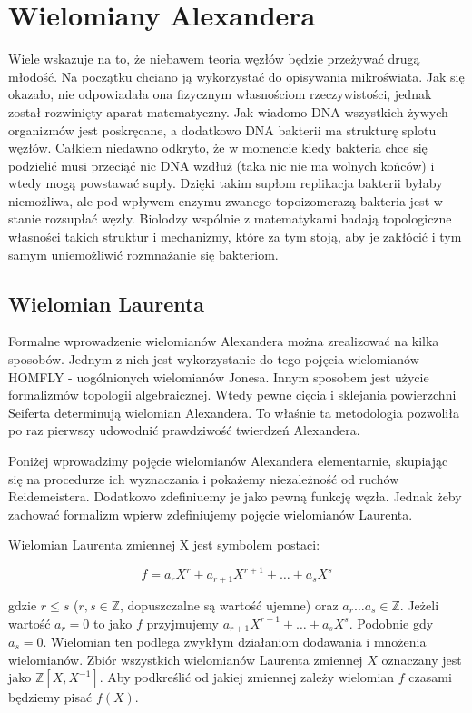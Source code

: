 \section{Wielomiany Alexandera}

Wiele wskazuje na to, że niebawem teoria węzłów będzie przeżywać drugą młodość. Na początku chciano ją wykorzystać do opisywania mikroświata. Jak się okazało, nie odpowiadała ona
fizycznym własnościom rzeczywistości, jednak został rozwinięty aparat matematyczny. Jak wiadomo DNA wszystkich żywych organizmów jest poskręcane, a dodatkowo DNA bakterii ma strukturę splotu węzłów.
Całkiem niedawno odkryto, że w momencie kiedy bakteria chce się podzielić musi przeciąć
nic DNA wzdłuż (taka nic nie ma wolnych końców) i wtedy mogą powstawać supły. Dzięki takim supłom replikacja bakterii byłaby niemożliwa, ale pod wpływem enzymu zwanego topoizomerazą bakteria jest w stanie
rozsupłać węzły. Biolodzy wspólnie z matematykami badają topologiczne własności takich struktur i mechanizmy, które za tym stoją, aby je zakłócić i tym samym uniemożliwić rozmnażanie się bakteriom.


 

\subsection{Wielomian Laurenta}

Formalne wprowadzenie wielomianów Alexandera można zrealizować na kilka sposobów. Jednym z nich jest wykorzystanie do tego pojęcia wielomianów HOMFLY - uogólnionych wielomianów Jonesa.
Innym sposobem jest
użycie formalizmów topologii algebraicznej. Wtedy pewne cięcia i sklejania powierzchni Seiferta determinują wielomian Alexandera. To właśnie ta metodologia
pozwoliła po raz pierwszy udowodnić prawdziwość twierdzeń Alexandera. 

Poniżej wprowadzimy pojęcie wielomianów Alexandera elementarnie, skupiając się
na procedurze ich wyznaczania i pokażemy niezależność od ruchów Reidemeistera. Dodatkowo zdefiniuemy je jako pewną funkcję węzła.
Jednak żeby zachować formalizm wpierw zdefiniujemy pojęcie wielomianów Laurenta.

\begin{definicja}
   Wielomian Laurenta zmiennej X jest symbolem postaci:

   $$
   f = a_rX^r + a_{r+1}X^{r+1} + \dots + a_sX^s
   $$

   gdzie $r \leqslant s$ ($r, s \in \mathbb{Z}$, dopuszczalne są wartość ujemne) oraz $a_r \dots a_s \in \mathbb{Z}$.
   Jeżeli wartość $a_r = 0$ to jako $f$ przyjmujemy $a_{r+1}X^{r+1} + \dots + a_sX^s$.
   Podobnie gdy $a_s = 0$.
   Wielomian ten podlega zwykłym działaniom dodawania i mnożenia wielomianów.
   Zbiór wszystkich wielomianów Laurenta zmiennej $X$ oznaczany jest jako $\mathbb{Z}[X, X^{-1}]$.
   Aby podkreślić od jakiej zmiennej zależy wielomian $f$ czasami będziemy pisać $f(X)$.
\end{definicja}

